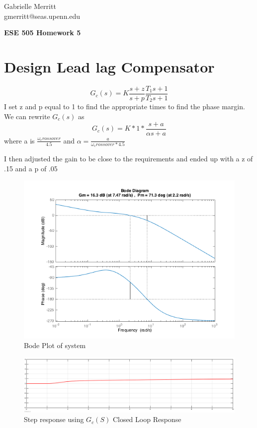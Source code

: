 \documentclass[english]{article}
\begin{document}
Gabrielle Merritt 
\\
gmerritt@seas.upenn.edu 
\begin{center}
{\textbf{ESE 505 Homework 5}} \\
\end{center}
\section*{Design Lead lag Compensator}
\begin{equation}
G_c(s) = K \frac{s+z}{s +p} \frac{T_1s +1 }{T_2s +1}
\end{equation}
I set z and p equal to 1 to find the appropriate times to find the phase margin. 
We can rewrite $G_c(s) $ as 
$$ G_c(s)  = K*1 * \frac{s + a}{\alpha s + a } $$ 
where a is $\frac{\omega_crossover}{ 4.5} $ and $\alpha  = \frac{a}{\omega_crossover * 4.5} $ 

I then adjusted the gain to be close to the requirements 
and ended up with a z of .15 and a p of .05 
\begin{figure}[h!]
\includegraphics[width = \linewidth]{1a.png}
\caption{Bode Plot of system }
\end{figure}
\begin{figure}[h!]
\includegraphics[width = \linewidth]{1b.png}
\caption{Step response using $G_c(S)$ Closed Loop Response}
\end{figure}
\FloatBarrier
\end{document}
